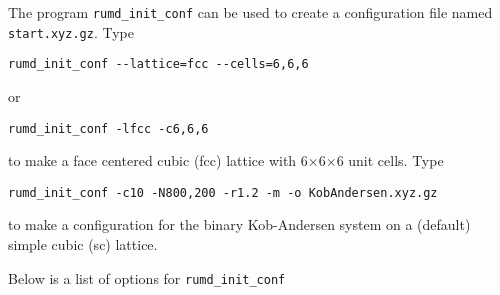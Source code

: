 \documentclass[a4paper]{article}
\begin{document}
The program \verb|rumd_init_conf| can be used to create a configuration file
named \verb|start.xyz.gz|. Type
\begin{verbatim}
rumd_init_conf --lattice=fcc --cells=6,6,6
\end{verbatim}
or
\begin{verbatim}
rumd_init_conf -lfcc -c6,6,6
\end{verbatim}
to make a face centered cubic (fcc) lattice with 6$\times$6$\times$6 unit cells.
Type
\begin{verbatim}
rumd_init_conf -c10 -N800,200 -r1.2 -m -o KobAndersen.xyz.gz
\end{verbatim}
to make a configuration for the binary Kob-Andersen system on a (default) simple cubic (sc) lattice.

Below is a list of options for \verb|rumd_init_conf| 
\end{document}
